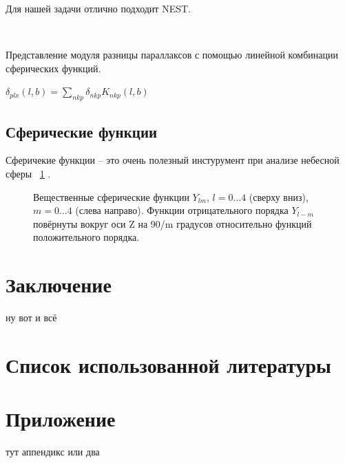 \documentclass[14pt]{article} %
\begin{document}
Для нашей задачи отлично подходит NEST.

~\cite{wiki:healpix} 


Представление модуля разницы параллаксов с помощью линейной комбинации сферических функций.

$\delta_{plx}(l,b) = \sum_{nkp}\delta_{nkp}K_{nkp}(l,b)$

\subsection{Сферические функции}\label{sub:smthsf}
Сферичекие функции -- это очень полезный инстурумент при анализе небесной сферы ~\ref{img:sf} .
~\cite{book:sf}






\begin{figure}[h!]
\caption{Вещественные сферические функции $Y_{lm}$, $l=0…4$ (сверху вниз), $m=0…4$ (слева направо). Функции отрицательного порядка $Y_{l-m}$ повёрнуты вокруг оси Z на 90/m градусов относительно функций положительного порядка.}
\label{img:sf}
\end{figure}



\section{Заключение}\label{conclusion}
		ну вот и всё \cite{book:fourier} 

\newpage
\section{Список использованной литературы}\label{conclusionlit}
%
%
\printbibliography[type=online,title={Online only}]
\printbibliography[type=book,title={Статьи:}]


\appendix

\section*{Приложение}
тут аппендикс или два 
\end{document}
